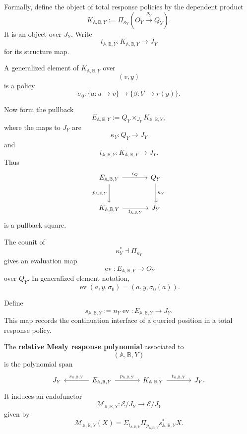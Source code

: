 Formally, define the object of total response policies by the dependent product
\[
K_{\mathbb A,\mathbb B,Y}
:=
\Pi_{\kappa_Y}(O_Y\xrightarrow{\rho_Y}Q_Y).
\]
It is an object over \(J_Y\).  Write
\[
t_{\mathbb A,\mathbb B,Y}:K_{\mathbb A,\mathbb B,Y}\to J_Y
\]
for its structure map.

A generalized element of \(K_{\mathbb A,\mathbb B,Y}\) over
\[
(v,y)
\]
is a policy
\[
\sigma_0:
\{a:u\to v\}
\longrightarrow
\{\beta:b'\to r(y)\}.
\]

Now form the pullback
\[
E_{\mathbb A,\mathbb B,Y}
:=
Q_Y\times_{J_Y}K_{\mathbb A,\mathbb B,Y},
\]
where the maps to \(J_Y\) are
\[
\kappa_Y:Q_Y\to J_Y
\]
and
\[
t_{\mathbb A,\mathbb B,Y}:K_{\mathbb A,\mathbb B,Y}\to J_Y.
\]
Thus
\[
\begin{tikzcd}[column sep=large,row sep=large]
E_{\mathbb A,\mathbb B,Y}
  \arrow[r, "\epsilon_Q"]
  \arrow[d, "p_{\mathbb A,\mathbb B,Y}"']
&
Q_Y
  \arrow[d, "\kappa_Y"]
\\
K_{\mathbb A,\mathbb B,Y}
  \arrow[r, "t_{\mathbb A,\mathbb B,Y}"']
&
J_Y
\end{tikzcd}
\]
is a pullback square.

The counit of
\[
\kappa_Y^\ast\dashv\Pi_{\kappa_Y}
\]
gives an evaluation map
\[
\operatorname{ev}:
E_{\mathbb A,\mathbb B,Y}\to O_Y
\]
over \(Q_Y\).  In generalized-element notation,
\[
\operatorname{ev}(a,y,\sigma_0)=(a,y,\sigma_0(a)).
\]

Define
\[
s_{\mathbb A,\mathbb B,Y}
:=
n_Y\operatorname{ev}
:
E_{\mathbb A,\mathbb B,Y}\to J_Y.
\]
This map records the continuation interface of a queried position in a total
response policy.

\begin{definition}
\label{def:poly-relative-mealy-response-polynomial}
The \textbf{relative Mealy response polynomial} associated to
\[
(\mathbb A,\mathbb B,Y)
\]
is the polynomial span
\[
\begin{tikzcd}[column sep=large]
J_Y
&
E_{\mathbb A,\mathbb B,Y}
  \arrow[l, "s_{\mathbb A,\mathbb B,Y}"']
  \arrow[r, "p_{\mathbb A,\mathbb B,Y}"]
&
K_{\mathbb A,\mathbb B,Y}
  \arrow[r, "t_{\mathbb A,\mathbb B,Y}"]
&
J_Y .
\end{tikzcd}
\]
It induces an endofunctor
\[
\mathcal M_{\mathbb A,\mathbb B,Y}:
\mathcal E/J_Y\to\mathcal E/J_Y
\]
given by
\[
\mathcal M_{\mathbb A,\mathbb B,Y}(X)
=
\Sigma_{t_{\mathbb A,\mathbb B,Y}}
\Pi_{p_{\mathbb A,\mathbb B,Y}}
s_{\mathbb A,\mathbb B,Y}^{\ast}X.
\]
\end{definition}

